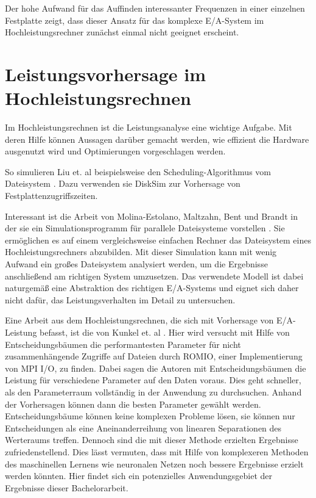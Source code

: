 \documentclass[
	twoside,
	12pt,
	a4paper,
	BCOR10mm,
	DIV14,
	listof=totoc,
	bibliography=totoc,
	headsepline
]{scrreprt}
\begin{document}
Der hohe Aufwand für das Auffinden interessanter Frequenzen in einer einzelnen Festplatte zeigt, dass dieser Ansatz für das komplexe E/A-System im Hochleistungsrechner zunächst einmal nicht geeignet erscheint.

\section{Leistungsvorhersage im Hochleistungsrechnen}
\label{rel_vorhersage_im-hpc}
Im Hochleistungsrechnen ist die Leistungsanalyse eine wichtige Aufgabe. Mit deren Hilfe können Aussagen darüber gemacht werden, wie effizient die Hardware ausgenutzt wird und Optimierungen vorgeschlagen werden. 

So simulieren Liu et. al beispielsweise den Scheduling-Algorithmus vom Dateisystem \cite{liu2011towards}. Dazu verwenden sie DiskSim \cite{Bucy08thedisksim} zur Vorhersage von Festplattenzugriffszeiten.

Interessant ist die Arbeit von Molina-Estolano, Maltzahn, Bent und Brandt in der sie ein Simulationsprogramm für parallele Dateisysteme vorstellen \cite{molina2009building}. Sie ermöglichen es auf einem vergleichsweise einfachen Rechner das Dateisystem eines Hochleistungsrechners abzubilden. Mit dieser Simulation kann mit wenig Aufwand ein großes Dateisystem analysiert werden, um die Ergebnisse anschließend am richtigen System umzusetzen. Das verwendete Modell ist dabei naturgemäß eine Abstraktion des richtigen E/A-Systems und eignet sich daher nicht dafür, das Leistungsverhalten im Detail zu untersuchen.

Eine Arbeit aus dem Hochleistungsrechnen, die sich mit Vorhersage von E/A-Leistung befasst, ist die von Kunkel et. al \cite{UMLTPTPONI15}. Hier wird versucht mit Hilfe von Entscheidungsbäumen die performantesten Parameter für nicht zusammenhängende Zugriffe auf Dateien durch ROMIO, einer Implementierung von MPI I/O, zu finden.
Dabei sagen die Autoren mit Entscheidungsbäumen die Leistung für verschiedene Parameter auf den Daten voraus. Dies geht schneller, als den Parameterraum vollständig in der Anwendung zu durchsuchen. Anhand der Vorhersagen können dann die besten Parameter gewählt werden.
Entscheidungsbäume können keine komplexen Probleme lösen, sie können nur Entscheidungen als eine Aneinanderreihung von linearen Separationen des Werteraums treffen. Dennoch sind die mit dieser Methode erzielten Ergebnisse zufriedenstellend. Dies lässt vermuten, dass mit Hilfe von komplexeren Methoden des maschinellen Lernens wie neuronalen Netzen noch bessere Ergebnisse erzielt werden könnten.
Hier findet sich ein potenzielles Anwendungsgebiet der Ergebnisse dieser Bachelorarbeit.
\end{document}
